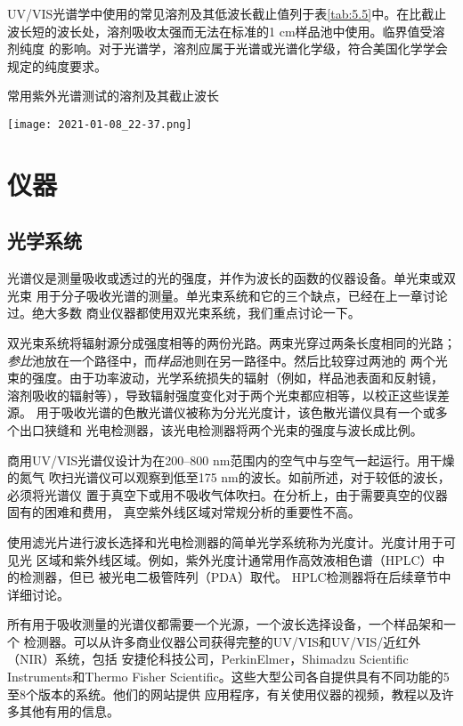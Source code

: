 UV/VIS光谱学中使用的常见溶剂及其低波长截止值列于表\ref{tab:5.5}中。在比截止
波长短的波长处，溶剂吸收太强而无法在标准的1 cm样品池中使用。临界值受溶剂纯度
的影响。对于光谱学，溶剂应属于光谱或光谱化学级，符合美国化学学会规定的纯度要求。
\begin{table}[htbp]
    \centering
    \caption{常用紫外光谱测试的溶剂及其截止波长}
    \label{tab:5.5}
    \texttt{[image: 2021-01-08\_22-37.png]}
\end{table}
\section{仪器}
\subsection{光学系统}
光谱仪是测量吸收或透过的光的强度，并作为波长的函数的仪器设备。单光束或双光束
用于分子吸收光谱的测量。单光束系统和它的三个缺点，已经在上一章讨论过。绝大多数
商业仪器都使用双光束系统，我们重点讨论一下。

双光束系统将辐射源分成强度相等的两份光路。两束光穿过两条长度相同的光路；
\emph{参比}池放在一个路径中，而\emph{样品}池则在另一路径中。然后比较穿过两池的
两个光束的强度。由于功率波动，光学系统损失的辐射（例如，样品池表面和反射镜，
溶剂吸收的辐射等），导致辐射强度变化对于两个光束都应相等，以校正这些误差源。
用于吸收光谱的色散光谱仪被称为分光光度计，该色散光谱仪具有一个或多个出口狭缝和
光电检测器，该光电检测器将两个光束的强度与波长成比例。

商用UV/VIS光谱仪设计为在200--800 nm范围内的空气中与空气一起运行。用干燥的氮气
吹扫光谱仪可以观察到低至175 nm的波长。如前所述，对于较低的波长，必须将光谱仪
置于真空下或用不吸收气体吹扫。在分析上，由于需要真空的仪器固有的困难和费用，
真空紫外线区域对常规分析的重要性不高。

使用滤光片进行波长选择和光电检测器的简单光学系统称为光度计。光度计用于可见光
区域和紫外线区域。例如，紫外光度计通常用作高效液相色谱（HPLC）中的检测器，但已
被光电二极管阵列（PDA）取代。 HPLC检测器将在后续章节中详细讨论。

所有用于吸收测量的光谱仪都需要一个光源，一个波长选择设备，一个样品架和一个
检测器。可以从许多商业仪器公司获得完整的UV/VIS和UV/VIS/近红外（NIR）系统，包括
安捷伦科技公司，PerkinElmer，Shimadzu Scientific Instruments和Thermo Fisher 
Scientific。这些大型公司各自提供具有不同功能的5至8个版本的系统。他们的网站提供
应用程序，有关使用仪器的视频，教程以及许多其他有用的信息。
